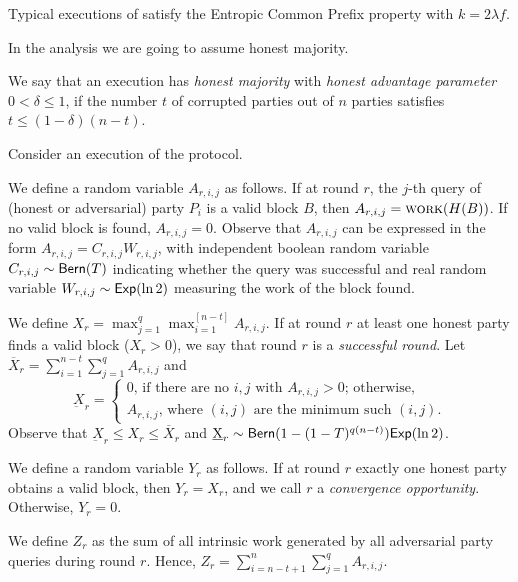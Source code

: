 \begin{conjecture}
  Typical executions of \poem satisfy the Entropic Common Prefix property
  with $k = 2 \lambda f$.
\end{conjecture}

In the analysis we are going to assume honest majority.

\begin{definition}
  We say that an execution has \emph{honest majority} with \emph{honest advantage parameter}
  $0 < \delta \leq 1$, if the number $t$ of corrupted parties out of
  $n$ parties satisfies $t \leq (1 - \delta) (n - t)$.
\end{definition}


Consider an execution of the \poem protocol.

We define a random variable $A_{r, i, j}$ as follows.
If at round $r$, the $j$-th query of (honest or adversarial) party $P_i$ is a valid block $B$,
then $A_{r, i, j} = \textsc{work}(H(B))$.
If no valid block is found, $A_{r, i, j} = 0$.
Observe that $A_{r, i, j}$ can be expressed in the form $A_{r, i, j} = C_{r, i, j} W_{r, i, j}$,
with independent boolean random variable $C_{r, i, j} \sim \textsf{Bern}(T)$ indicating whether the query was successful
and real random variable $W_{r, i, j} \sim \textsf{Exp}(\ln2)$ measuring the work of the block found.

We define $X_{r} = \max_{j=1}^q \max_{i = 1}^{[n - t]} A_{r, i, j}$.
If at round $r$ at least one honest party finds a valid block ($X_r > 0$),
we say that round $r$ is a \emph{successful round}.
Let $\overline{X}_r = \sum_{i = 1}^{n - t} \sum_{j = 1}^q A_{r,i,j}$ and
\[
  \underbar{X}_r = \begin{cases}
  0 \text{, if there are no $i, j$ with $A_{r,i,j} > 0$; otherwise,}\\
  A_{r,i,j} \text{, where $(i, j)$ are the minimum such $(i, j)$.}
\end{cases}\]
Observe that $\underbar{X}_r \leq X_r \leq \overline{X}_r$
and $\underbar{X}_r \sim \textsf{Bern}(1 - (1 - T)^{q(n - t)}) \textsf{Exp}(\ln 2)$.

We define a random variable $Y_r$ as follows.
If at round $r$ exactly one honest party obtains a valid block, then $Y_r = X_r$,
and we call $r$ a \emph{convergence opportunity}. Otherwise, $Y_r = 0$.

We define $Z_{r}$ as the sum of all intrinsic work generated by all adversarial
party queries during round $r$. Hence, $Z_{r} = \sum_{i = n - t + 1}^n \sum_{j = 1}^q A_{r, i, j}$.

